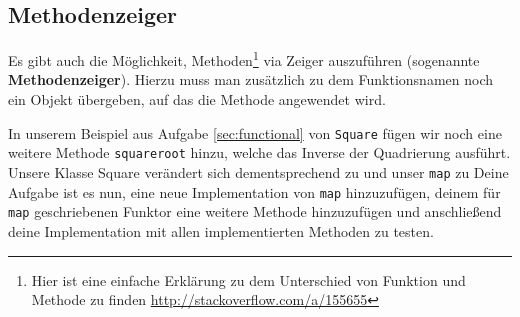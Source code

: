 \subsection{\ExercisePrefixAdvanced Methodenzeiger \optional}
\optionaltextboxCPP
{}
\label{sec:functional_method}
Es gibt auch die Möglichkeit, Methoden\footnote{Hier ist eine einfache Erklärung zu dem Unterschied von Funktion und Methode zu finden \url{http://stackoverflow.com/a/155655}} via Zeiger auszuführen (sogenannte \textbf{Methodenzeiger}).
Hierzu muss man zusätzlich zu dem Funktionsnamen noch ein Objekt übergeben, auf das die Methode angewendet wird.

In unserem Beispiel aus Aufgabe \ref{sec:functional} von \lstinline{Square} fügen wir noch eine weitere Methode \lstinline{squareroot} hinzu, welche das Inverse der Quadrierung ausführt.
Unsere Klasse Square verändert sich dementsprechend zu
%
%
und unser \lstinline{map} zu 
%
%
Deine Aufgabe ist es nun, eine neue Implementation von \lstinline{map} hinzuzufügen, deinem für \lstinline{map} geschriebenen Funktor eine weitere Methode hinzuzufügen und anschließend deine Implementation mit allen implementierten Methoden zu testen.